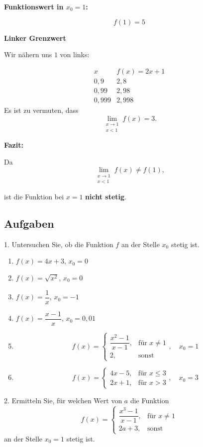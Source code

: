 \documentclass[12pt]{article}
\newcommand{\limeslinks}[2]{%
  \lim_{\substack{#1 \to #2 \\ #1 < #2}}%
}
\begin{document}
\textbf{Funktionswert in $x_0=1$:}

$$f(1)=5$$

\textbf{Linker Grenzwert}

Wir nähern uns $1$ von links:

\[
\begin{array}{c|c}
x & f(x)=2x+1 \\
\hline
0,9 & 2,8 \\
0,99 & 2,98 \\
0,999 & 2,998
\end{array}
\]
Es ist zu vermuten, dass
\[
\limeslinks{x}{1} f(x)=3.
\]


\textbf{Fazit:}
\vspace{0.5cm}

Da
\[
\limeslinks{x}{1} f(x) \ne f(1),
\]

ist die Funktion bei $x=1$ \textbf{nicht stetig}.
\newpage
\subsection*{Aufgaben}


1. Untersuchen Sie, ob die Funktion $f$ an der Stelle $x_0$ stetig ist.

\begin{enumerate}[label=(\alph*)]

\item $f(x)=4x+3$, \quad $x_0=0$

\item $f(x)=\sqrt{x^2}$, \quad $x_0=0$

\item $f(x)=\dfrac{1}{x}$, \quad $x_0=-1$

\item $f(x)=\dfrac{x-1}{x}$, \quad $x_0=0,01$

\item 
\[
f(x)=
\begin{cases}
\dfrac{x^2-1}{x-1}, & \text{für } x\ne1\\
2, & \text{sonst}
\end{cases},\quad x_0=1
\]


\item
\[
f(x)=
\begin{cases}
4x-5, & \text{für } x\le3\\
2x+1, & \text{für } x>3
\end{cases},\quad x_0=3
\]


\end{enumerate}

\vspace{1cm}

2. Ermitteln Sie, für welchen Wert von $a$ die Funktion $$f(x)=
\begin{cases}
\dfrac{x^3-1}{x-1}, & \text{für } x\ne1\\
2a+3, & \text{sonst}
\end{cases}
$$ an der Stelle $x_0=1$ stetig ist.
\end{document}
